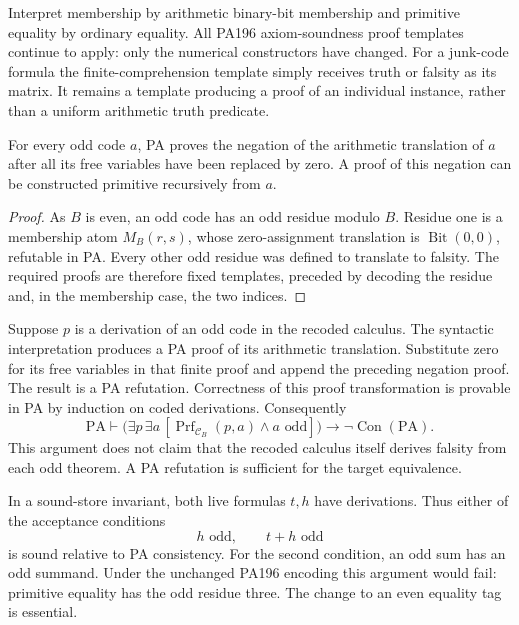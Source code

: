 Interpret membership by arithmetic binary-bit membership and primitive
equality by ordinary equality.  All PA196 axiom-soundness proof templates
continue to apply: only the numerical constructors have changed.  For a
junk-code formula the finite-comprehension template simply receives truth
or falsity as its matrix.  It remains a template producing a proof of an
individual instance, rather than a uniform arithmetic truth predicate.

\begin{lemma}
For every odd code $a$, PA proves the negation of the arithmetic translation
of $a$ after all its free variables have been replaced by zero.  A proof of
this negation can be constructed primitive recursively from $a$.
\end{lemma}
\begin{proof}
As $B$ is even, an odd code has an odd residue modulo $B$.  Residue one is
a membership atom $M_B(r,s)$, whose zero-assignment translation is
$\operatorname{Bit}(0,0)$, refutable in PA.  Every other odd residue was
defined to translate to falsity.  The required proofs are therefore fixed
templates, preceded by decoding the residue and, in the membership case,
the two indices.
\end{proof}

Suppose $p$ is a derivation of an odd code in the recoded calculus.  The
syntactic interpretation produces a PA proof of its arithmetic translation.
Substitute zero for its free variables in that finite proof and append the
preceding negation proof.  The result is a PA refutation.  Correctness of this
proof transformation is provable in PA by induction on coded derivations.
Consequently
\[
 \mathrm{PA}\vdash
 \bigl(\exists p\,\exists a\,[\operatorname{Prf}_{\mathcal C_B}(p,a)
                          \land a\text{ odd}]\bigr)
       \longrightarrow\neg\operatorname{Con}(\mathrm{PA}).
\]
This argument does not claim that the recoded calculus itself derives
falsity from each odd theorem.  A PA refutation is sufficient for the target
equivalence.

In a sound-store invariant, both live formulas $t,h$ have derivations.
Thus either of the acceptance conditions
\[
 h\text{ odd},\qquad t+h\text{ odd}
\]
is sound relative to PA consistency.  For the second condition, an odd sum
has an odd summand.  Under the unchanged PA196 encoding this argument would
fail: primitive equality has the odd residue three.  The change to an even
equality tag is essential.


